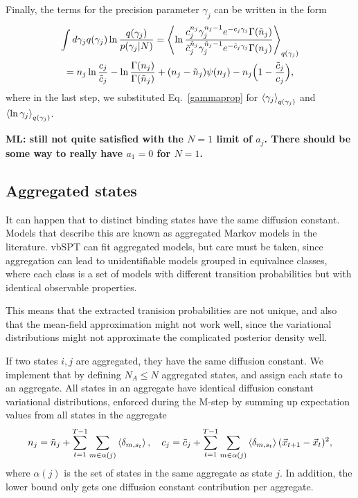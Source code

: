 Finally, the terms for the precision parameter $\gamma_j$ can be
written in the form
\begin{multline}
\int d\gamma_j q(\gamma_j)\ln\frac{q(\gamma_j)}{p(\gamma_j|N)}
=\left\langle \ln\frac{c_j^{n_j}\gamma_j^{n_j-1}e^{-c_j\gamma_j}\Gamma(\tilde n_j)}
      {\tilde c_j^{\tilde n_j}\gamma_j^{\tilde n_j-1}e^{-\tilde c_j\gamma_j}\Gamma(n_j)}\right\rangle_{q(\gamma_j)}\\
=n_j\ln\frac{c_j}{\tilde c_j}                    
-\ln\frac{\Gamma(n_j)}{\Gamma(\tilde n_j)}
+(n_j-\tilde n_j)\psi(n_j)
-n_j\Big(1-\frac{\tilde c_j}{c_j}\Big),
\end{multline}
where in the last step, we substituted Eq.~\eqref{gammaprop} for
$\left\langle \gamma_j\right\rangle_{q(\gamma_j)}$ and
$\left\langle \ln\gamma_j\right\rangle_{q(\gamma_j)}$.

{\bf ML: still not quite satisfied with the $N=1$ limit of
$a_j$. There should be some way to really have $a_1=0$ for $N=1$.}

\subsection{Aggregated states}
It can happen that to distinct binding states have the same diffusion
constant. Models that describe this are known as aggregated Markov
models in the
literature\cite{Fredkin1986,Kienker1989,Bruno2005,Flomenbom2006}. vbSPT
can fit aggregated models, but care must be taken, since aggregation
can lead to unidentifiable models grouped in equivalnce classes, where
each class is a set of models with different transition probabilities
but with identical observable properties.

This means that the extracted tranision probabilities are not unique,
and also that the mean-field approximation might not work well, since
the variational distributions might not approximate the complicated
posterior density well.

If two states $i,j$ are aggregated, they have the same diffusion
constant. We implement that by defining $N_A\le N$ aggregated states,
and assign each state to an aggregate. All states in an aggregate have
identical diffusion constant variational distributions, enforced
during the M-step by summing up expectation values from all states in
the aggregate 
\begin{equation}
n_j=\tilde n_j+\sum_{t=1}^{T-1}\sum_{m\in \alpha(j)}\left\langle \delta_{m,s_t}\right\rangle,\quad
c_j=\tilde c_j+\sum_{t=1}^{T-1}\sum_{m\in \alpha(j)}
           \left\langle \delta_{m,s_t}\right\rangle(\vec x_{t+1}-\vec x_t)^2,
\end{equation}
where $\alpha(j)$ is the set of states in the same aggregate as state
$j$. In addition, the lower bound only gets one diffusion constant
contribution per aggregate.

